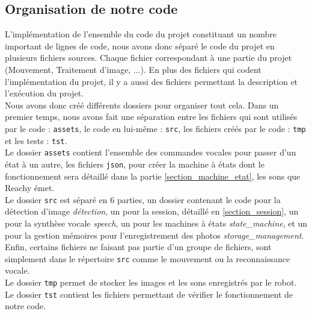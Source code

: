 \documentclass[a4paper,french]{article}
\begin{document}
\subsection{Organisation de notre code}
L'implémentation de l'ensemble du code du projet constituant un nombre important de lignes de code, nous avons donc séparé le code du projet en plusieurs fichiers sources. Chaque fichier correspondant à une partie du projet (Mouvement, Traitement d'image, ...). En plus des fichiers qui codent l'implémentation du projet, il y a aussi des fichiers permettant la description et l'exécution du projet. \\
Nous avons donc créé différents dossiers pour organiser tout cela. Dans un premier temps, nous avons fait une séparation entre les fichiers qui sont utilisés par le code : \texttt{assets}, le code en lui-même : \texttt{src}, les fichiers créés par le code : \texttt{tmp} et les tests : \texttt{tst}.\\

Le dossier \texttt{assets} contient l'ensemble des commandes vocales pour passer d'un état à un autre, les fichiers \texttt{json}, pour créer la machine à états dont le fonctionnement sera détaillé dans la partie \ref{section_machine_etat}, les sons que Reachy émet.\\

Le dossier \texttt{src} est séparé en 6 parties, un dossier contenant le code pour la détection d'image \textit{détection}, un pour la session, détaillé en \ref{section_session}, un pour la synthèse vocale \textit{speech}, un pour les machines à états \textit{state\_machine}, et un pour la gestion mémoires pour l'enregistrement des photos \textit{storage\_management}. Enfin, certains fichiers ne faisant pas partie d'un groupe de fichiers, sont simplement dans le répertoire \texttt{src} comme le mouvement ou la reconnaissance vocale.\\

Le dossier \texttt{tmp} permet de stocker les images et les sons enregistrés par le robot.\\

Le dossier \texttt{tst} contient les fichiers permettant de vérifier le fonctionnement de notre code.\\
\end{document}
